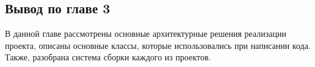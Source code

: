 \documentclass[14pt,a4paper]{scrartcl}
\begin{document}
    
    
    

    \subsection{Вывод по главе 3}\label{subsec:3-conclusion}\indent

    В данной главе рассмотрены основные архитектурные решения реализации проекта, описаны основные классы, которые использовались при написании кода.
    Также, разобрана система сборки каждого из проектов.

    

    

    
    
\end{document}
